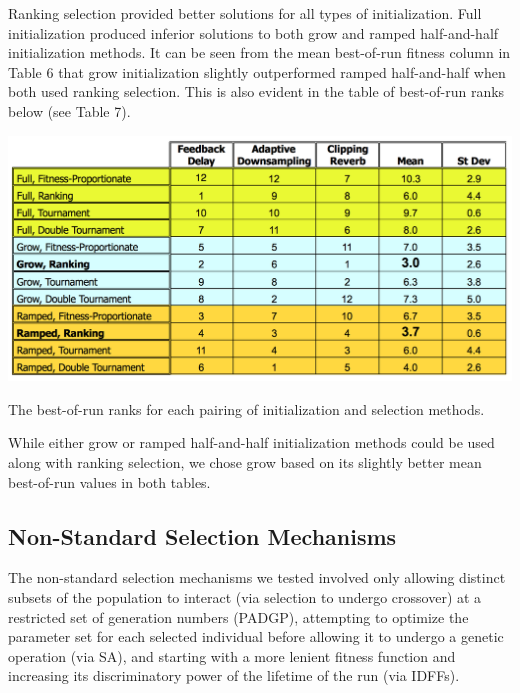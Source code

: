 \documentclass[12pt]{report} 	%
\numberwithin{figure}{chapter}
\numberwithin{table}{chapter}
\numberwithin{equation}{chapter}
\begin{document}
\begin{flushleft}
Ranking selection provided better solutions for all types of initialization. Full initialization produced inferior solutions to both grow and ramped half-and-half initialization methods. It can be seen from the mean best-of-run fitness column in Table 6 that grow initialization slightly outperformed ramped half-and-half when both used ranking selection. This is also evident in the table of best-of-run ranks below (see Table 7).
\begin{table}[h!]
\begin{center}
\includegraphics[scale=0.6,width=\linewidth]{InitializationTable2}
\caption[Initialization and selection best-of-run ranks]{The best-of-run ranks for each pairing of initialization and selection methods.}
\end{center}
\end{table}
While either grow or ramped half-and-half initialization methods could be used along with ranking selection, we chose grow based on its slightly better mean best-of-run values in both tables.

\subsection{Non-Standard Selection Mechanisms}
The non-standard selection mechanisms we tested involved only allowing distinct subsets of the population to interact (via selection to undergo crossover) at a restricted set of generation numbers (PADGP), attempting to optimize the parameter set for each selected individual before allowing it to undergo a genetic operation (via SA), and starting with a more lenient fitness function and increasing its discriminatory power of the lifetime of the run (via IDFFs).


\end{flushleft}
\end{document}
